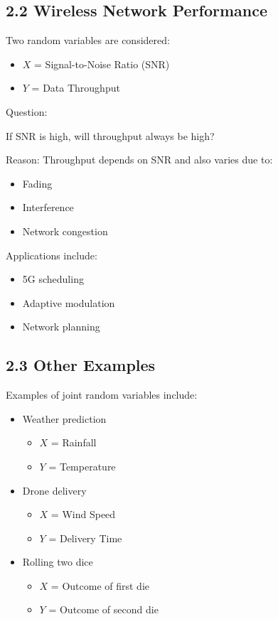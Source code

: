 \documentclass{article}
\begin{document}
\subsection*{2.2 Wireless Network Performance}

Two random variables are considered:

\begin{itemize}
\item $X$ = Signal-to-Noise Ratio (SNR)
\item $Y$ = Data Throughput
\end{itemize}

Question:

If SNR is high, will throughput always be high?

Reason: Throughput depends on SNR and also varies due to:

\begin{itemize}
\item Fading
\item Interference
\item Network congestion
\end{itemize}

Applications include:

\begin{itemize}
\item 5G scheduling
\item Adaptive modulation
\item Network planning
\end{itemize}

\subsection*{2.3 Other Examples}

Examples of joint random variables include:

\begin{itemize}
\item Weather prediction
\begin{itemize}
\item $X$ = Rainfall
\item $Y$ = Temperature
\end{itemize}

\item Drone delivery
\begin{itemize}
\item $X$ = Wind Speed
\item $Y$ = Delivery Time
\end{itemize}

\item Rolling two dice
\begin{itemize}
\item $X$ = Outcome of first die
\item $Y$ = Outcome of second die
\end{itemize}
\end{itemize}
\end{document}
